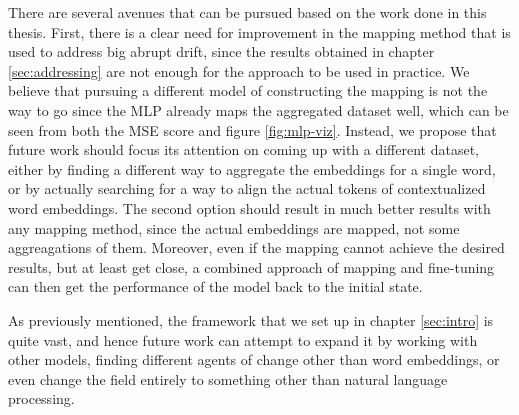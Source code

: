 \documentclass[12pt]{extreport}
\begin{document}
There are several avenues that can be pursued based on the work done in this thesis. First, there is a clear need for improvement in the mapping method that is used to address big abrupt drift, since the results obtained in chapter \ref{sec:addressing} are not enough for the approach to be used in practice. We believe that pursuing a different model of constructing the mapping is not the way to go since the MLP already maps the aggregated dataset well, which can be seen from both the MSE score and figure \ref{fig:mlp-viz}. Instead, we propose that future work should focus its attention on coming up with a different dataset, either by finding a different way to aggregate the embeddings for a single word, or by actually searching for a way to align the actual tokens of contextualized word embeddings. The second option should result in much better results with any mapping method, since the actual embeddings are mapped, not some aggreagations of them. Moreover, even if the mapping cannot achieve the desired results, but at least get close, a combined approach of mapping and fine-tuning can then get the performance of the model back to the initial state.

As previously mentioned, the framework that we set up in chapter \ref{sec:intro} is quite vast, and hence future work can attempt to expand it by working with other models, finding different agents of change other than word embeddings, or even change the field entirely to something other than natural language processing.



\end{document}
